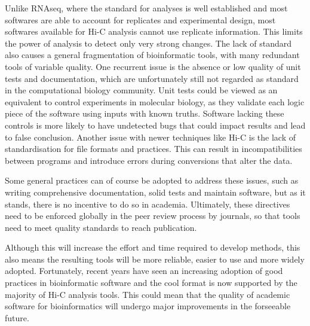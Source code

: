 Unlike RNAseq, where the standard for analyses is well established and most softwares are able to account for replicates and experimental design, most softwares available for Hi-C analysis cannot use replicate information. This limits the power of analysis to detect only very strong changes. The lack of standard also causes a general fragmentation of bioinformatic tools, with many redundant tools of variable quality. One recurrent issue is the absence or low quality of unit tests and documentation, which are unfortunately still not regarded as standard in the computational biology community. Unit tests could be viewed as an equivalent to control experiments in molecular biology, as they validate each logic piece of the software using inputs with known truths. Software lacking these controls is more likely to have undetected bugs that could impact results and lead to false conclusion.
Another issue with newer techniques like Hi-C is the lack of standardisation for file formats and practices. This can result in incompatibilities between programs and introduce errors during conversions that alter the data.

Some general practices can of course be adopted to address these issues, such as writing comprehensive documentation, solid tests and maintain software, but as it stands, there is no incentive to do so in academia. Ultimately, these directives need to be enforced globally in the peer review process by journals, so that tools need to meet quality standards to reach publication.

Although this will increase the effort and time required to develop methods, this also means the resulting tools will be more reliable, easier to use and more widely adopted. Fortunately, recent years have seen an increasing adoption of good practices in bioinformatic software and the cool format is now supported by the majority of Hi-C analysis tools. This could mean that the quality of academic software for bioinformatics will undergo major improvements in the forseeable future. 